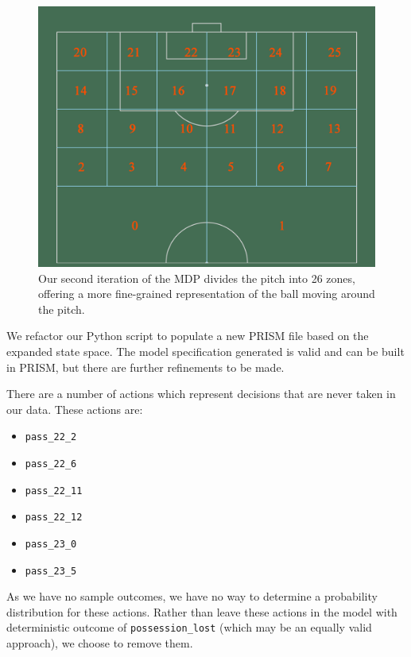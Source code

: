 \documentclass{l4proj}
\begin{document}
\begin{figure}[h]
    \centering
    \includegraphics[scale=0.4]{images/zones2.png}   
    \caption{Our second iteration of the MDP divides the pitch into 26 zones, offering a more fine-grained representation of the ball moving around the pitch.}
    \label{fig:zones2} 
\end{figure}

We refactor our Python script to populate a new PRISM file based on the expanded state space. The model specification generated is valid and can be built in PRISM, but there are further refinements to be made.

There are a number of actions which represent decisions that are never taken in our data. These actions are:

\begin{itemize}
    \item \texttt{pass\_22\_2}
    \item \texttt{pass\_22\_6}
    \item \texttt{pass\_22\_11}
    \item \texttt{pass\_22\_12}
    \item \texttt{pass\_23\_0}
    \item \texttt{pass\_23\_5}
\end{itemize}

As we have no sample outcomes, we have no way to determine a probability distribution for these actions. Rather than leave these actions in the model with deterministic outcome of \texttt{possession\_lost} (which may be an equally valid approach), we choose to remove them.
\end{document}
